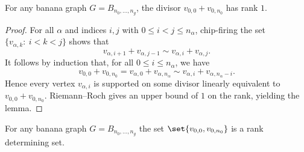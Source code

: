 \begin{lemma}\label{lem:g12}
For any banana graph $G= B_{n_0,\dots,n_g}$, the divisor $v_{0,0} + v_{0,n_0}$ has rank $1$.
\end{lemma}

\begin{proof}
For all $\alpha$ and indices $i,j$ with $0 \leq i < j \leq n_\alpha$, chip-firing the set $\{v_{\alpha,k}:\ i <  k < j \}$  shows that 
$$v_{\alpha,i+1} + v_{\alpha,j-1} \sim v_{\alpha,i} + v_{\alpha,j}.$$
It follows by induction that, for all $0 \leq i \leq n_\alpha$, we have
$$v_{0,0} + v_{0,n_0} = v_{\alpha,0} + v_{\alpha,n_\alpha} \sim v_{\alpha,i} + v_{\alpha,n_\alpha-i}.$$
Hence every vertex $v_{\alpha,i}$ is supported on some divisor linearly equivalent to $v_{0,0} + v_{0,n_0}$. Riemann--Roch \cite[Theorem 1.12]{BakNor07} gives an upper bound of $1$ on the rank, yielding the lemma.
\end{proof}

\begin{lemma}\label{lem-BananaRDS}
    For any banana graph $G= B_{n_0,\dots,n_g}$ the set $\set{v_{0,0},v_{0,n_0}}$ is a rank determining set.
\end{lemma}

